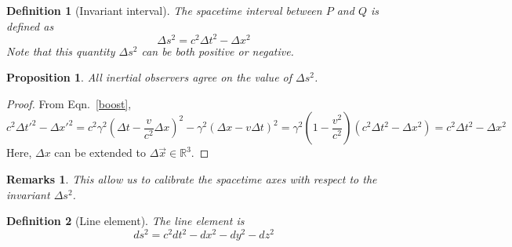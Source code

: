 \documentclass[a4paper]{article}
\newtheorem{remarks}{Remarks}[section]
\theoremstyle{new}
\newtheorem{defi}{Definition}[section]
\newtheorem{prop}{Proposition}[section]
\begin{document}
\begin{defi}[Invariant interval]
  The spacetime interval between $P$ and $Q$ is defined as
$$\Delta s^2 = c^2 \Delta t^2 - \Delta x^2$$
  Note that this quantity $\Delta s^2$ can be both positive or negative.
\end{defi}
\begin{prop}
  All inertial observers agree on the value of $\Delta s^2$.
\end{prop}
\begin{proof} From Eqn.~\ref{boost},
$$c^2 \Delta t'^2 - \Delta x'^2 = c^2 \gamma^2 \left(\Delta t - \frac{v}{c^2}\Delta x\right)^2 - \gamma^2 (\Delta x - v\Delta t)^2= \gamma^2 \left(1 - \frac{v^2}{c^2}\right)(c^2 \Delta t^2 - \Delta x^2)= c^2\Delta t^2 - \Delta x^2$$
Here, $\Delta x$ can be extended to $\Delta\vec{x}\in\mathbb{R}^3$.
\end{proof}
\begin{remarks}
This allow us to calibrate the spacetime axes with respect to the invariant $\Delta s^2$.
\end{remarks}
\begin{defi}[Line element]
  The line element is
  \begin{equation}
d s^2 = c^2 d t^2 - d x^2 - d y^2 - d z^2\label{ds2}
\end{equation}
\end{defi}
\end{document}
